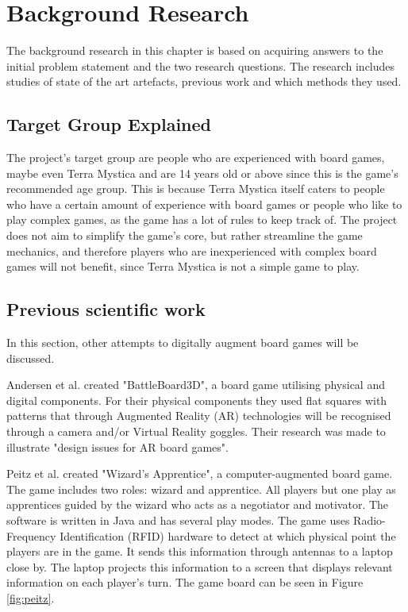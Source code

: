 \chapter{Background Research}\label{ch:bgres}
The background research in this chapter is based on acquiring answers to the initial problem statement and the two research questions. The research includes studies of state of the art artefacts, previous work and which methods they used. 


\section{Target Group Explained}
The project's target group are people who are experienced with board games, maybe even Terra Mystica and are 14 years old or above since this is the game's recommended age group. This is because Terra Mystica itself caters to people who have a certain amount of experience with board games or people who like to play complex games, as the game has a lot of rules to keep track of. The project does not aim to simplify the game's core, but rather streamline the game mechanics, and therefore players who are inexperienced with complex board games will not benefit, since Terra Mystica is not a simple game to play.



\section{Previous scientific work}
In this section, other attempts to digitally augment board games will be discussed.

Andersen et al. \citep{andersen_designing_2004} created "BattleBoard3D", a board game utilising physical and digital components. For their physical components they used flat squares with patterns that through Augmented Reality (AR) technologies will be recognised through a camera and/or Virtual Reality goggles. Their research was made to illustrate "design issues for AR board games".

Peitz et al. \citep{peitzWizards2006} created "Wizard's Apprentice", a computer-augmented board game. The game includes two roles: wizard and apprentice. All players but one play as apprentices guided by the wizard who acts as a negotiator and motivator. The software is written in Java and has several play modes. The game uses Radio-Frequency Identification (RFID) hardware to detect at which physical point the players are in the game. It sends this information through antennas to a laptop close by. The laptop projects this information to a screen that displays relevant information on each player's turn. The game board can be seen in Figure \ref{fig:peitz}.

